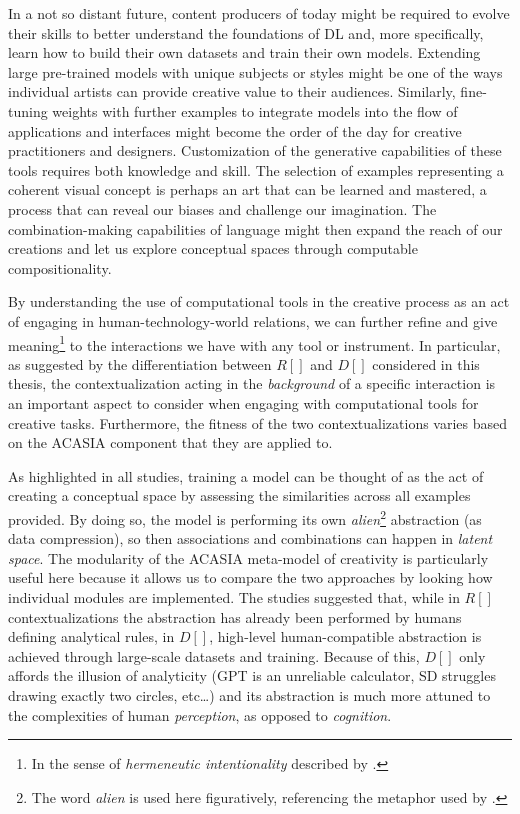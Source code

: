 In a not so distant future, content producers of today might be required to evolve their skills to better understand the foundations of DL and, more specifically, learn how to build their own datasets and train their own models. Extending large pre-trained models with unique subjects or styles might be one of the ways individual artists can provide creative  value to their audiences. Similarly, fine-tuning weights with further examples to integrate models into the flow of applications and interfaces might become the order of the day for creative practitioners and designers. Customization of the generative capabilities of these tools requires both knowledge and skill.
The selection of  examples representing a coherent visual concept is perhaps an art that can be learned and mastered, a process that can reveal our biases and challenge our imagination. The combination-making capabilities of language might then expand the reach of our creations and let us explore conceptual spaces through computable compositionality.

 By understanding the use of computational tools in the creative process as an act of engaging in  human-technology-world relations, we can further refine and give meaning\footnote{In the sense of \emph{hermeneutic intentionality} described by \cite{Ihde1990}.} to the interactions we have with any tool or instrument. In particular, as suggested by the differentiation between $R[]$ and $D[]$ considered in this thesis, the contextualization acting in the \emph{background} of a specific interaction is an important aspect to consider when engaging with computational tools for creative tasks. Furthermore, the fitness of the two contextualizations varies based on the ACASIA component that they are applied to.

As highlighted in all studies, training a model can be thought of as the act of creating a conceptual space by assessing the similarities across all examples provided. By doing so, the model is performing its own \emph{alien}\footnote{The word \emph{alien} is used here figuratively, referencing the metaphor used by \cite{Fazi2018}.}  abstraction (as data compression), so then associations and combinations can happen in \emph{latent space}. The modularity of the ACASIA \citep{Hoorn2014} meta-model of creativity is particularly useful here because it allows us to compare the two approaches by looking how individual modules are implemented. The studies suggested that, while in $R[]$ contextualizations the abstraction has already been performed by humans defining analytical rules, in $D[]$, high-level human-compatible abstraction is achieved through large-scale datasets and training. Because of this, $D[]$ only affords the illusion of analyticity (GPT is an unreliable calculator, SD struggles drawing exactly two circles, etc…) and its abstraction is much more attuned to the complexities of human \emph{perception}, as opposed to \emph{cognition}.

